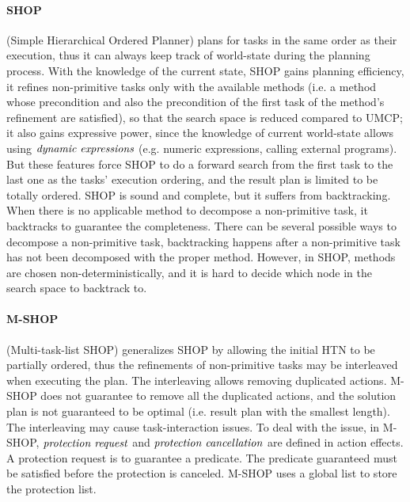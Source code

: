 \paragraph*{SHOP}
\label{sec:SHOP}
\cite{4} \cite{4_1} (Simple Hierarchical Ordered Planner) plans for tasks in the same order as their execution, thus it can always keep track of world-state during the planning process. With the knowledge of the current state, SHOP gains planning efficiency, it refines non-primitive tasks only with the available methods (i.e. a method whose precondition and also the precondition of the first task of the method’s refinement are satisfied), so that the search space is reduced compared to UMCP; it also gains expressive power, since the knowledge of current world-state allows using $\emph{dynamic expressions}$ (e.g. numeric expressions, calling external programs). But these features force SHOP to do a forward search from the first task to the last one as the tasks’ execution ordering, and the result plan is limited to be totally ordered. SHOP is sound and complete, but it suffers from backtracking. When there is no applicable method to decompose a non-primitive task, it backtracks to guarantee the completeness. There can be several possible ways to decompose a non-primitive task, backtracking happens after a non-primitive task has not been decomposed with the proper method. However, in SHOP, methods are chosen non-deterministically, and it is hard to decide which node in the search space to backtrack to. 
\label{sec:SHOP}

\paragraph*{M-SHOP}
\cite{5} (Multi-task-list SHOP) generalizes SHOP by allowing the initial HTN to be partially ordered, thus the refinements of non-primitive tasks may be interleaved when executing the plan. The interleaving allows removing duplicated actions. M-SHOP does not guarantee to remove all the duplicated actions, and the solution plan is not guaranteed to be optimal (i.e. result plan with the smallest length). The interleaving may cause task-interaction issues. To deal with the issue, in M-SHOP, $\emph{protection request}$ and $\emph{protection cancellation}$ are defined in action effects. A protection request is to guarantee a predicate. The predicate guaranteed must be satisfied before the protection is canceled. M-SHOP uses a global list to store the protection list. 


